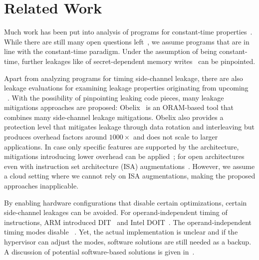 \section{Related Work}
\label{sec:related-work}
Much work has been put into analysis of programs for constant-time properties~\cite{DBLP:conf/uss/AlmeidaBBDE16, DBLP:conf/ccs/WichelmannSP022, DBLP:journals/tissec/DanielBR22}.
While there are still many open questions left~\cite{DBLP:conf/ccs/GeimerVRDBM23}, we assume programs that are in line with the constant-time paradigm.
Under the assumption of being constant-time, further leakages like \ssss{} of secret-dependent memory writes~\cite{DBLP:conf/uss/DengLTWYZ23} can be pinpointed.

Apart from analyzing programs for timing side-channel leakage, there are also leakage evaluations for examining leakage properties originating from upcoming \uarchopts{}~\cite{DBLP:conf/isca/VicarteSNT0KF21, DBLP:conf/ccs/BartheBCCGGRSWY24}.
With the possibility of pinpointing leaking code pieces, many leakage mitigations approaches are proposed:
Obelix~\cite{DBLP:conf/sp/WichelmannRPE24} is an ORAM-based tool that combines many side-channel leakage mitigations.
Obelix also provides a protection level that mitigates \ctsc{} leakage through data rotation and interleaving but produces overhead factors around $1000\times$ and does not scale to larger applications.
In case only specific features are supported by the architecture, mitigations introducing lower overhead can be applied~\cite{DBLP:conf/eurosp/WinderixMP21}; for open architectures even with instruction set architecture (ISA) augmentations~\cite{DBLP:conf/eurosp/BognarWBP23, DBLP:conf/sp/WinderixBNDP24}.
However, we assume a cloud setting where we cannot rely on ISA augmentations, making the proposed approaches inapplicable.

By enabling hardware configurations that disable certain optimizations, certain side-channel leakages can be avoided.
For operand-independent timing of instructions, ARM introduced DIT~\cite{arm-dit} and Intel DOIT~\cite{intel-doit}.
The operand-independent timing modes disable \dmping{}~\cite{intelDdp,DBLP:conf/uss/ChenWSFKPG24}.
Yet, the actual implementation is unclear and if the hypervisor can adjust the modes, software solutions are still needed as a backup.
A discussion of potential software-based solutions is given in~.

